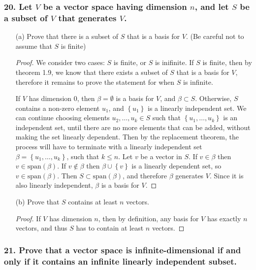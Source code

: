 \documentclass{article}
\begin{document}
\subsubsection*{20. Let $V$ be a vector space having dimension $n$, and let $S$ be a subset of $V$ that generates $V$.}
\begin{enumerate}
	\item[(a)] Prove that there is a subset of $S$ that is a basis for $V$. (Be careful not to assume that $S$ is finite)
	\begin{proof}
		We consider two cases: $S$ is finite, or $S$ is inifinite. If $S$ is finite, then by theorem 1.9, we know that there exists a subset of $S$ that is a basis for $V$, therefore it remains to prove the statement for when $S$ is infinite. 
		
		If $V$ has dimension $0$, then $\beta = \emptyset$ is a basis for $V$, and $\beta \subset S$. Otherwise, $S$ contains a non-zero element $u_1$, and $\left\{u_1\right\}$ is a linearly independent set. We can continue choosing elements $u_2, \dots, u_k \in S$ such that $\left\{u_1, \dots, u_k\right\}$ is an independent set, until there are no more elements that can be added, without making the set linearly dependent. Then by the replacement theorem, the process will have to terminate with a linearly independent set $\beta = \left\{u_1, \dots, u_k\right\}$, such that $k \le n$. Let $v$ be a vector in $S$. If $v \in \beta$ then $v \in \text{span}(\beta)$. If $v \notin \beta$ then $\beta \cup \left\{v\right\}$ is a linearly dependent set, so $v \in \text{span}(\beta)$. Then $S \subset \text{span}(\beta)$, and therefore $\beta$ generates $V$. Since it is also linearly independent, $\beta$ is a basis for $V$.
	\end{proof} 
	\pagebreak
	\item[(b)] Prove that $S$ contains at least $n$ vectors.
	\begin{proof}
		If $V$ has dimension $n$, then by definition, any basis for $V$ has exactly $n$ vectors, and thus $S$ has to contain at least $n$ vectors.
	\end{proof}
\end{enumerate}

\subsubsection*{21. Prove that a vector space is infinite-dimensional if and only if it contains an infinite linearly independent subset.}
\end{document}
